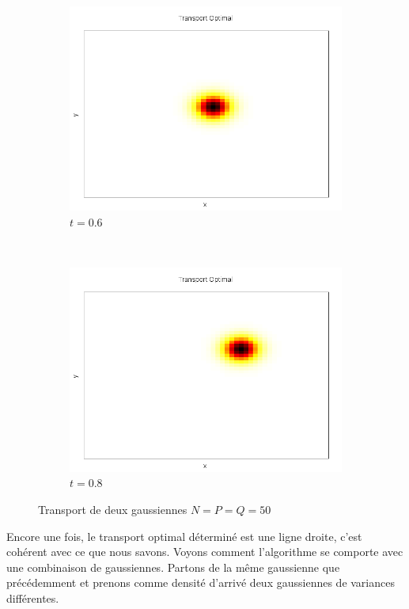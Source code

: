 \documentclass[a4paper,12pt]{article}
\begin{document}
\begin{figure}[!h]
\begin{subfigure}[b]{0.22\linewidth}
	\includegraphics[width=\textwidth]{img/2DGaussian/C_00030.png}
	\caption{$t=0.6$}
	\end{subfigure}
	~
	\begin{subfigure}[b]{0.22\linewidth}
	\includegraphics[width=\textwidth]{img/2DGaussian/C_00040.png}
	\caption{$t=0.8$}
	\end{subfigure}
	\caption{Transport de deux gaussiennes $N=P=Q=50$}
\end{figure}

Encore une fois, le transport optimal déterminé est une ligne droite, c'est cohérent avec ce que nous savons. Voyons comment l'algorithme se comporte avec une combinaison de gaussiennes. Partons de la même gaussienne que précédemment et prenons comme densité d'arrivé deux gaussiennes de variances différentes. 
\end{document}
